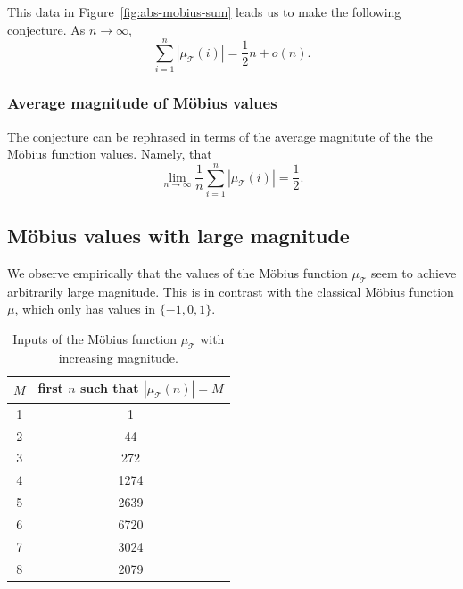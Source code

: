 \documentclass{amsart}
\newenvironment{customconj}[1]
  {\renewcommand\theinnercustomthm{#1}\innercustomthm}
  {\endinnercustomthm}
\theoremstyle{definition}
\newcommand{\Mobius}{M\"obius}
\newcommand{\mutri}{\mu_{\tri}}
\newcommand{\tri}{\mathcal T}
\begin{document}
This data in Figure~\ref{fig:abs-mobius-sum} leads us to make the following conjecture.
\begin{customconj}{\ref{conj:mobius-abs-sum}}[Partial sums of $|\mutri|$]
As $n \to \infty$,
\begin{equation*}
    \sum_{i=1}^n |\mutri(i)| = \frac12 n + o(n).
\end{equation*}
\end{customconj}

\subsubsection{Average magnitude of \Mobius{} values}

The conjecture can be rephrased in terms of the average magnitute of the the \Mobius{} function values.
Namely, that
\[
    \lim_{n \to \infty} \frac{1}{n} \sum_{i = 1}^n |\mutri(i)| = \frac12 .
\]


\subsection{\Mobius{} values with large magnitude}

We observe empirically that the values of the \Mobius{} function $\mutri$ seem to achieve arbitrarily large magnitude.
This is in contrast with the classical \Mobius{} function $\mu$, which only has values in $\{-1, 0, 1\}$.

\begin{table}[h]
    \centering
    \begin{tabular}{||c | c ||} 
    \hline
    $M$ & first $n$ such that $|\mutri(n)| = M$ \\ [0.5ex] 
    \hline\hline
    1 & 1 \\ 
    2 & 44 \\
    3 & 272 \\
    4 & 1274 \\
    5 & 2639  \\
    6 & 6720  \\
    7 & 3024  \\
    8 & 2079  \\ [1ex] 
    \hline
    \end{tabular}
    \vspace{0.5cm}
    \caption{Inputs of the \Mobius{} function $\mutri$ with increasing magnitude.}
    \label{table:mobius-tri-large}
\end{table}
\end{document}
